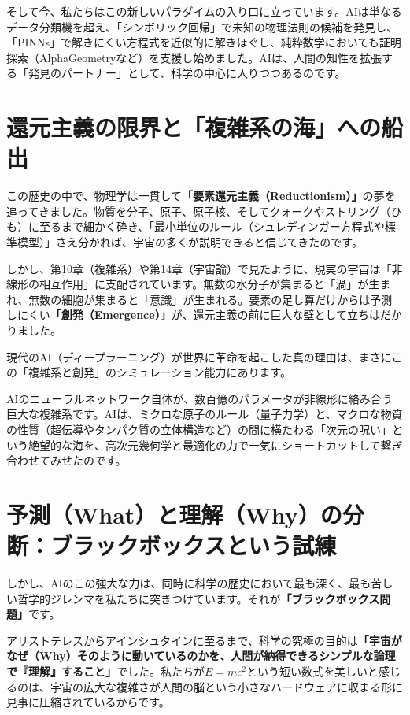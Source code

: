 そして今、私たちはこの新しいパラダイムの入り口に立っています。AIは単なるデータ分類機を超え、「シンボリック回帰」で未知の物理法則の候補を発見し、「PINNs」で解きにくい方程式を近似的に解きほぐし、純粋数学においても証明探索（AlphaGeometryなど）を支援し始めました。AIは、人間の知性を拡張する「発見のパートナー」として、科学の中心に入りつつあるのです。

\section{還元主義の限界と「複雑系の海」への船出}

この歴史の中で、物理学は一貫して\textbf{「要素還元主義（Reductionism）」}の夢を追ってきました。物質を分子、原子、原子核、そしてクォークやストリング（ひも）に至るまで細かく砕き、「最小単位のルール（シュレディンガー方程式や標準模型）」さえ分かれば、宇宙の多くが説明できると信じてきたのです。

しかし、第10章（複雑系）や第14章（宇宙論）で見たように、現実の宇宙は「非線形の相互作用」に支配されています。無数の水分子が集まると「渦」が生まれ、無数の細胞が集まると「意識」が生まれる。要素の足し算だけからは予測しにくい\textbf{「創発（Emergence）」}が、還元主義の前に巨大な壁として立ちはだかりました。

現代のAI（ディープラーニング）が世界に革命を起こした真の理由は、まさにこの「複雑系と創発」のシミュレーション能力にあります。

AIのニューラルネットワーク自体が、数百億のパラメータが非線形に絡み合う巨大な複雑系です。AIは、ミクロな原子のルール（量子力学）と、マクロな物質の性質（超伝導やタンパク質の立体構造など）の間に横たわる「次元の呪い」という絶望的な海を、高次元幾何学と最適化の力で一気にショートカットして繋ぎ合わせてみせたのです。

\section{予測（What）と理解（Why）の分断：ブラックボックスという試練}

しかし、AIのこの強大な力は、同時に科学の歴史において最も深く、最も苦しい哲学的ジレンマを私たちに突きつけています。それが\textbf{「ブラックボックス問題」}です。

アリストテレスからアインシュタインに至るまで、科学の究極の目的は\textbf{「宇宙がなぜ（Why）そのように動いているのかを、人間が納得できるシンプルな論理で『理解』すること」}でした。私たちが\(E=mc^2\)という短い数式を美しいと感じるのは、宇宙の広大な複雑さが人間の脳という小さなハードウェアに収まる形に見事に圧縮されているからです。

